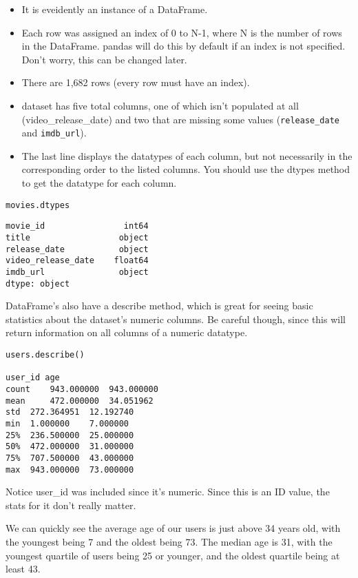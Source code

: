\documentclass[]{article}
\begin{document}
\begin{itemize}
\item It is eveidently an instance of a DataFrame.
\item Each row was assigned an index of 0 to N-1, where N is the number of rows in the DataFrame. pandas will do this by default if an index is not specified. Don't worry, this can be changed later.
\item There are 1,682 rows (every row must have an index).
\item  dataset has five total columns, one of which isn't populated at all (video\_release\_date) and two that are missing some values (\texttt{release\_date} and \texttt{imdb\_url}).
\item The last line displays the datatypes of each column, but not necessarily in the corresponding order to the listed columns. You should use the dtypes method to get the datatype for each column.
\end{itemize}

\begin{verbatim}
movies.dtypes
\end{verbatim}
\begin{framed}
\begin{verbatim}
movie_id                int64
title                  object
release_date           object
video_release_date    float64
imdb_url               object
dtype: object
\end{verbatim}
\end{framed}
DataFrame's also have a describe method, which is great for seeing basic statistics about the dataset's numeric columns. Be careful though, since this will return information on all columns of a numeric datatype.

\begin{verbatim}
users.describe()

user_id	age
count	 943.000000	 943.000000
mean	 472.000000	 34.051962
std	 272.364951	 12.192740
min	 1.000000	 7.000000
25%	 236.500000	 25.000000
50%	 472.000000	 31.000000
75%	 707.500000	 43.000000
max	 943.000000	 73.000000
\end{verbatim}
Notice user\_id was included since it's numeric. Since this is an ID value, the stats for it don't really matter.

We can quickly see the average age of our users is just above 34 years old, with the youngest being 7 and the oldest being 73. The median age is 31, with the youngest quartile of users being 25 or younger, and the oldest quartile being at least 43.
\end{document}
